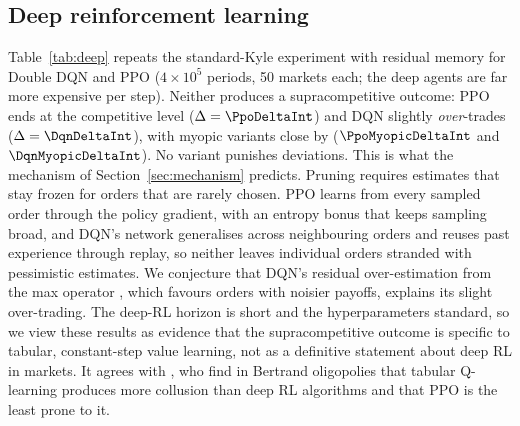 \subsection{Deep reinforcement learning}
\label{sec:deep}

Table~\ref{tab:deep} repeats the standard-Kyle experiment with residual memory
for Double DQN and PPO ($4\times10^5$ periods, 50 markets each; the deep agents
are far more expensive per step). Neither produces a supracompetitive outcome:
PPO ends at the competitive level ($\Delta=\PpoDeltaInt$) and DQN slightly
\emph{over}-trades ($\Delta=\DqnDeltaInt$), with myopic variants close by
($\PpoMyopicDeltaInt$ and $\DqnMyopicDeltaInt$). No variant punishes deviations.
This is what the mechanism of Section~\ref{sec:mechanism} predicts. Pruning
requires estimates that stay frozen for orders that are rarely chosen. PPO
learns from every sampled order through the policy gradient, with an entropy
bonus that keeps sampling broad, and DQN's network generalises across
neighbouring orders and reuses past experience through replay, so neither
leaves individual orders stranded with pessimistic estimates. We conjecture
that DQN's residual over-estimation from the max operator
\citep{thrun1993,vanhasselt2016}, which favours orders with noisier payoffs,
explains its slight over-trading. The deep-RL horizon is short and the
hyperparameters standard, so we view these results as evidence that the
supracompetitive outcome is specific to tabular, constant-step value learning,
not as a definitive statement about deep RL in markets. It agrees with
\citet{deng2024}, who find in Bertrand oligopolies that tabular Q-learning
produces more collusion than deep RL algorithms and that PPO is the least
prone to it.

\begin{table}[t]
  \centering
  \small
  \resizebox{0.9\linewidth}{!}{}
  \caption{Learning algorithms in the standard Kyle market ($\xi=0$, $I=2$,
  residual memory). Tabular Q: 600 markets, $6\times10^6$ periods; DQN and
  PPO: 50 markets, $4\times10^5$ periods. 95\% CIs.}
  \label{tab:deep}
\end{table}
